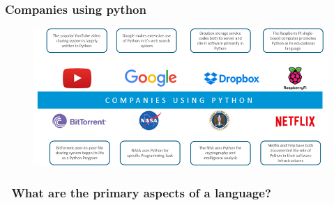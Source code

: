 \documentclass[notes]{beamer}
\begin{document}
\begin{frame}[fragile]
	\frametitle{Companies using python}
	\begin{figure}[ht]
		\centering
		\includegraphics[width=\textwidth]{figs/python-companies.png}
	\end{figure}
\end{frame}

\begin{frame}
	\frametitle{\faCommentO ~What are the primary aspects of a language?}
\end{frame}
\end{document}
